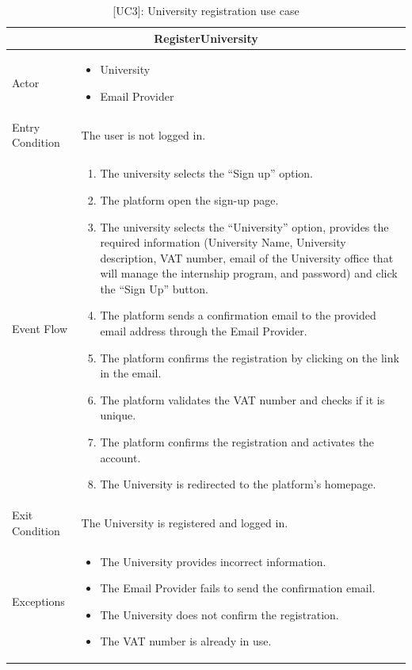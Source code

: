 \begin{table}[H]
    \centering
    \begin{tabular}{|p{3cm}|p{12cm}|}
    \hline
    \multicolumn{2}{|c|}{\textbf{RegisterUniversity}} \\ \hline
    Actor & 
    \begin{itemize}
        \item University
        \item Email Provider
    \end{itemize} \\ \hline
    Entry Condition & The user is not logged in. \\ \hline
    Event Flow &
    \begin{enumerate}         
        \item The university selects the “Sign up” option.
        \item The platform open the sign-up page.
        \item The university selects the “University” option, provides the required information (University Name, University description, VAT number, email of the University office that will manage the internship program, and password) and click the “Sign Up” button.
        \item The platform sends a confirmation email to the provided email address through the Email Provider.
        \item The platform confirms the registration by clicking on the link in the email.
        \item The platform validates the VAT number and checks if it is unique.
        \item The platform confirms the registration and activates the account.
        \item The University is redirected to the platform's homepage.
    \end{enumerate} \\ \hline
    Exit Condition & The University is registered and logged in.\\ \hline
    Exceptions &
    \begin{itemize}
        \item The University provides incorrect information.
        \item The Email Provider fails to send the confirmation email.
        \item The University does not confirm the registration.
        \item The VAT number is already in use.
    \end{itemize} \\ \hline
    \end{tabular}
    \caption{[UC3]: University registration use case}
    \label{tab:UC3}
\end{table}

